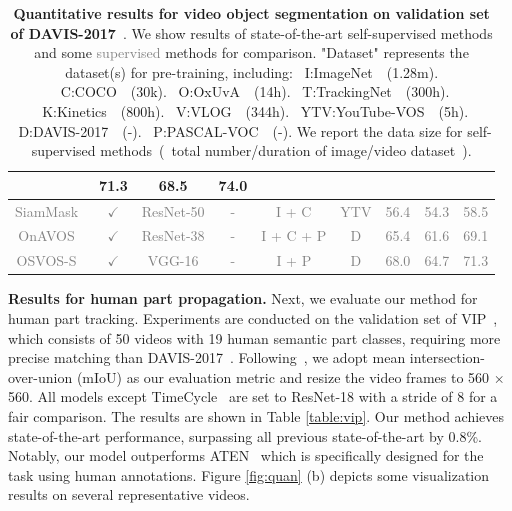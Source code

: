 \documentclass{article}
\begin{document}
\begin{table}[t]
{\begin{tabular}{ccccccccc}
			& \textbf{71.3}  & \textbf{68.5} & \textbf{74.0}  \\
      \hline
      \textcolor{gray}{SiamMask~\cite{wang2019fast}} & \textcolor{gray}{$\checkmark$} & \textcolor{gray}{ResNet-50} & \textcolor{gray}{-} & \textcolor{gray}{I + C} & \textcolor{gray}{YTV}
			& \textcolor{gray}{56.4} & \textcolor{gray}{54.3}  & \textcolor{gray}{58.5}  \\
      \textcolor{gray}{OnAVOS~\cite{voigtlaender2017online}} & \textcolor{gray}{$\checkmark$} & \textcolor{gray}{ResNet-38} & \textcolor{gray}{-} & \textcolor{gray}{I + C + P} & \textcolor{gray}{D}
			& \textcolor{gray}{65.4} & \textcolor{gray}{61.6}  & \textcolor{gray}{69.1}  \\
      \textcolor{gray}{OSVOS-S~\cite{maninis2018video}}  & \textcolor{gray}{$\checkmark$} & \textcolor{gray}{VGG-16} & \textcolor{gray}{-} & \textcolor{gray}{I + P} & \textcolor{gray}{D}
			& \textcolor{gray}{68.0}   & \textcolor{gray}{64.7} & \textcolor{gray}{71.3}  \\
			\bottomrule
		\end{tabular}
	}
	\captionsetup{font=footnotesize}
	\caption{\textbf{Quantitative results for video object segmentation on validation set of DAVIS-2017}~\cite{pont20172017}. We show results of state-of-the-art self-supervised methods and some \textcolor{gray}{supervised} methods for comparison. "Dataset" represents the dataset(s) for pre-training, including: ~I:ImageNet~\cite{deng2009large}~(1.28m). ~C:COCO~\cite{lin2014microsoft}~(30k). ~O:OxUvA~\cite{valmadre2018long}~(14h). ~T:TrackingNet~\cite{muller2018trackingnet}~(300h). ~K:Kinetics~\cite{carreira2017quo}~(800h). ~V:VLOG~\cite{fouhey2018lifestyle}~(344h). ~YTV:YouTube-VOS~\cite{xu2018youtube}~(5h). ~D:DAVIS-2017~\cite{pont20172017}~(-). ~P:PASCAL-VOC~\cite{everingham2015pascal}~(-). We report the data size for self-supervised methods~(~total number/duration of image/video dataset~).}
	\label{table:sota}
	\vspace{-17pt}
\end{table}


\textbf{Results for human part propagation.} Next, we evaluate our method for human part tracking. Experiments are conducted on the validation set of VIP~\cite{zhou2018adaptive}, which consists of 50 videos with 19 human semantic part classes, requiring more precise matching than DAVIS-2017~\cite{pont20172017}. Following~\cite{zhou2018adaptive}, we adopt mean intersection-over-union (mIoU) as our evaluation metric and resize the video frames to 560 $\times$ 560. All models except TimeCycle~\cite{wang2019learning} are set to ResNet-18 with a stride of 8 for a fair comparison. The results are shown in Table \ref{table:vip}. Our method achieves state-of-the-art performance, surpassing all previous state-of-the-art by 0.8\%. Notably, our model outperforms ATEN~\cite{zhou2018adaptive} which is specifically designed for the task using human annotations. Figure \ref{fig:quan} (b) depicts some visualization results on several representative videos.
\end{document}
